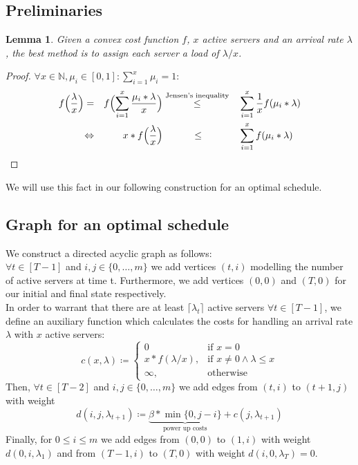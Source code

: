\documentclass[hidelinks]{article}
\theoremstyle{plain}
\newtheorem{lem}[thm]{Lemma}
\theoremstyle{definition}
\theoremstyle{rem}
\begin{document}
\begin{sloppypar}
\subsection{Preliminaries}
\begin{lem}\label{lem:share}
	Given a convex cost function $f$, $x$ active servers and an arrival rate $\lambda$, the best method is to assign each server a load of $\lambda/x$.
\end{lem}
\begin{proof}
$\forall x\in\mathbb{N},\mu_i\in[0,1]:\sum\limits_{i=1}^{x}{\mu_i}=1:$
\begin{alignat*}{5}
	f\Bigl(\frac{\lambda}{x}\Bigr)=&&f\Bigl(\sum\limits_{i=1}^x{\frac{\mu_i*\lambda}{x}}\Bigr)&\stackrel{\text{Jensen's inequality}}{\le}&&\sum\limits_{i=1}^x\frac{1}{x}f(\mu_i*\lambda) \\
	\Leftrightarrow&&x*f\Bigl(\frac{\lambda}{x}\Bigr)&\qquad\quad\le&&\sum\limits_{i=1}^xf(\mu_i*\lambda)
\end{alignat*}
\end{proof}
We will use this fact in our following construction for an optimal schedule.

\subsection{Graph for an optimal schedule}
We construct a directed acyclic graph as follows:\\
$\forall t\in[T-1]$ and $i,j\in\{0,\ldots,m\}$ we add vertices $(t,i)$ modelling the number of active servers at time t. Furthermore, we add vertices $(0,0)$ and $(T,0)$ for our initial and final state respectively.\\
In order to warrant that there are at least $\lceil\lambda_t\rceil$ active servers $\forall t\in[T-1]$, we define an auxiliary function which calculates the costs for handling an arrival rate $\lambda$ with $x$ active servers:
\begin{equation}
	c(x,\lambda)\coloneqq\begin{cases}
          0 & \text{if $x=0$}\\
	  x*f(\lambda/x), & \text{if $x\ne 0\wedge\lambda\le x$}\\
	  \infty, & \text{otherwise}
	  \end{cases} \label{fct:c}
\end{equation}
Then, $\forall t\in[T-2]$ and $i,j\in\{0,\ldots,m\}$ we add edges from $(t,i)$ to $(t+1,j)$ with weight
\begin{equation}
	d(i,j,\lambda_{t+1})\coloneqq\underbrace{\beta*\min\{0,j-i\}}_{\text{power up costs}}+c(j,\lambda_{t+1})
\end{equation}
Finally, for $0\le i\le m$ we add edges from $(0,0)$ to $(1,i)$ with weight $d(0,i,\lambda_1)$ and from $(T-1,i)$ to $(T,0)$ with weight $d(i,0,\lambda_T)=0$.
\begin{figure}[H]
\centering
\begin{tikzpicture}[->,>=stealth',auto,node distance=3cm,thick,node/.style={minimum size=1.2cm,circle,draw}]


\end{tikzpicture}
\end{figure}
\end{sloppypar}
\end{document}
